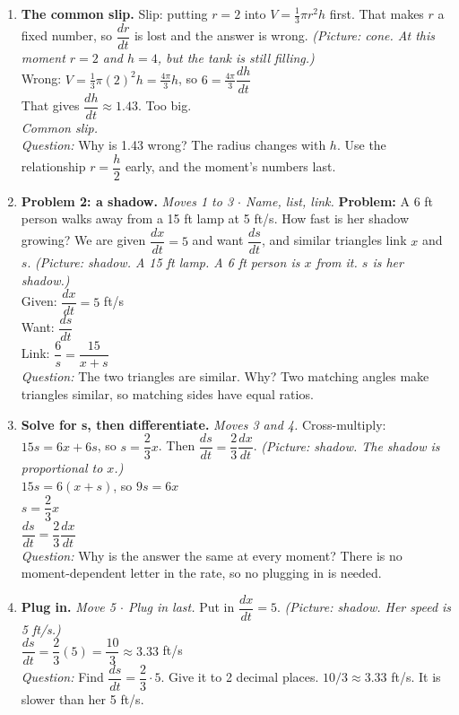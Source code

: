 \documentclass[11pt]{article}
\begin{document}
\begin{enumerate}
\item \textbf{The common slip.} Slip: putting $r=2$ into $V=\tfrac13\pi r^2h$ first. That makes $r$ a fixed number, so $\dfrac{dr}{dt}$ is lost and the answer is wrong. \textit{(Picture: cone. At this moment $r=2$ and $h=4$, but the tank is still filling.)}\\ Wrong: $V=\tfrac13\pi(2)^2h=\tfrac{4\pi}{3}h$, so $6=\tfrac{4\pi}{3}\dfrac{dh}{dt}$\\ That gives $\dfrac{dh}{dt}\approx1.43$. Too big.\\ \textit{Common slip.}\\ \textit{Question:} Why is 1.43 wrong?  The radius changes with $h$. Use the relationship $r=\dfrac h2$ early, and the moment's numbers last.
\item \textbf{Problem 2: a shadow.} \textit{Moves 1 to 3 $\cdot$ Name, list, link.} \textbf{Problem:} A 6 ft person walks away from a 15 ft lamp at 5 ft/s. How fast is her shadow growing? We are given $\dfrac{dx}{dt}=5$ and want $\dfrac{ds}{dt}$, and similar triangles link $x$ and $s$. \textit{(Picture: shadow. A 15 ft lamp. A 6 ft person is $x$ from it. $s$ is her shadow.)}\\ Given: $\dfrac{dx}{dt}=5$ ft/s\\ Want: $\dfrac{ds}{dt}$\\ Link: $\dfrac{6}{s}=\dfrac{15}{x+s}$\\ \textit{Question:} The two triangles are similar. Why?  Two matching angles make triangles similar, so matching sides have equal ratios.
\item \textbf{Solve for s, then differentiate.} \textit{Moves 3 and 4.} Cross-multiply: $15s=6x+6s$, so $s=\dfrac23x$. Then $\dfrac{ds}{dt}=\dfrac23\dfrac{dx}{dt}$. \textit{(Picture: shadow. The shadow is proportional to $x$.)}\\ $15s=6(x+s)$, so $9s=6x$\\ $s=\dfrac23x$\\ $\dfrac{ds}{dt}=\dfrac23\dfrac{dx}{dt}$\\ \textit{Question:} Why is the answer the same at every moment?  There is no moment-dependent letter in the rate, so no plugging in is needed.
\item \textbf{Plug in.} \textit{Move 5 $\cdot$ Plug in last.} Put in $\dfrac{dx}{dt}=5$. \textit{(Picture: shadow. Her speed is 5 ft/s.)}\\ $\dfrac{ds}{dt}=\dfrac23(5)=\dfrac{10}{3}\approx3.33$ ft/s\\ \textit{Question:} Find $\dfrac{ds}{dt}=\dfrac23\cdot5$. Give it to 2 decimal places.  $10/3\approx3.33$ ft/s. It is slower than her 5 ft/s.
\end{enumerate}
\end{document}
